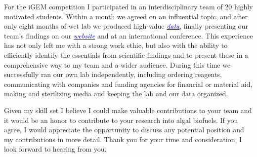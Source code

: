 \documentclass[11pt,a4paper,sans]{moderncv}
\begin{document}
\begin{spacing}{1.15}
For the iGEM competition I participated in an interdisciplinary team of 20 highly motivated students.
Within a month we agreed on an influential topic, and after only eight months of wet lab we produced high-value  {\href{https://www.ncbi.nlm.nih.gov/pubmed/29803867}{\textcolor{blue}{\textit{data}}}}, finally presenting our team's findings on our {\href{http://2015.igem.org/Team:Freiburg}{\textcolor{blue}{\textit{website}}}} and at an international conference. 
This experience has not only left me with a strong work ethic, but also with the ability to efficiently identify the essentials from scientific findings and to present these in a comprehensive way to my team and a wider audience. 
During this time we successfully ran our own lab independently, including ordering reagents, communicating with companies and funding agencies for financial or material aid, making and sterilizing media and keeping the lab and our data organized. \par

Given my skill set I believe I could make valuable contributions to your team and it would be an honor to contribute to your research into algal biofuels. 
If you agree, I would appreciate the opportunity to discuss any potential position and my contributions in more detail. 
Thank you for your time and consideration, I look forward to hearing from you.


 

\end{spacing}
\makeletterclosing
\end{document}
